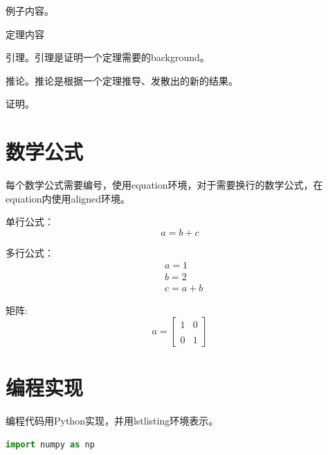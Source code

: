 \documentclass[a4paper,9pt]{extarticle}
\begin{document}
\begin{multicols*}{2}
\begin{example}
    例子内容。
\end{example}

\begin{theorem}
    定理内容
\end{theorem}

\begin{lemma}
    引理。引理是证明一个定理需要的background。
\end{lemma}

\begin{corollary}
    推论。推论是根据一个定理推导、发散出的新的结果。
\end{corollary}

\begin{pr}
    证明。
\end{pr}


\section{数学公式}

    每个数学公式需要编号，使用equation环境，对于需要换行的数学公式，在equation内使用aligned环境。
    
    单行公式：
    \begin{equation}
        a = b + c
    \end{equation}
    
    多行公式：
    \begin{equation}
        \begin{aligned}
        & a = 1 \\
        & b = 2 \\
        & c = a + b
        \end{aligned}
    \end{equation}
    
    矩阵:
    \begin{equation}
        a = \begin{bmatrix} 
            1 & 0 \\\\
            0 & 1 
            \end{bmatrix}
    \end{equation}
\section{编程实现}
    编程代码用Python实现，并用lstlisting环境表示。
    \begin{lstlisting}[language=Python]
    import numpy as np
    

\end{lstlisting}
\end{multicols*}
\end{document}

